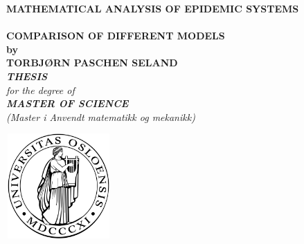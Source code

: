 %
\thispagestyle{empty}
\begin{center}        %
  \LARGE
  \textbf{MATHEMATICAL ANALYSIS OF EPIDEMIC SYSTEMS\\}
  \textbf{\\COMPARISON OF DIFFERENT MODELS\\}
  \Large
  \vspace{5mm}
  \textbf{by} \\
  \vspace{5mm}
  \large
  \textbf{TORBJØRN PASCHEN SELAND} \\
  \vspace{12mm}
  \Large
  {\bf{\textsl{THESIS}}} \\
  \textsl{for the degree of} \\
  \vspace{2mm}
  {\bf{\textsl{MASTER OF SCIENCE}}} \\
  \vspace{5mm}
  {\large \textsl {(Master i Anvendt matematikk og mekanikk)}}\\
  \vspace{10mm}
  \centerline{\includegraphics[width=4cm,height=4cm]{uiologo.png}}

\end{center}
